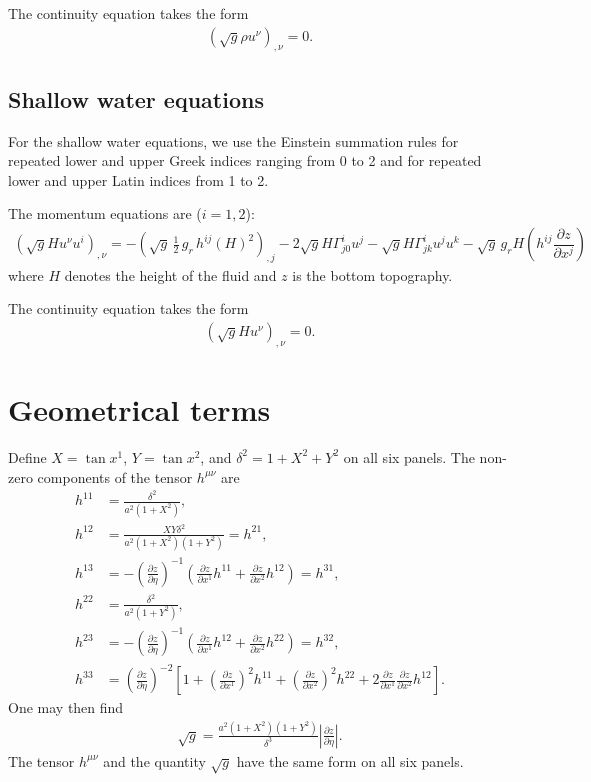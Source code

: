 \documentclass{article}
\begin{document}
The continuity equation takes the form
\begin{align}
\left( \sqrt{g}\rho u^\nu \right)_{,\nu} = 0.
\end{align}

\subsection{Shallow water equations}
For the shallow water equations, we use the Einstein summation rules for repeated lower and upper Greek indices ranging from 0 to 2 and for repeated lower and upper Latin indices from 1 to 2.

The momentum equations are ($i=1,2$):
\begin{align}
   \left( \sqrt{g} H u^\nu u^i\right)_{,\nu} = - \left( \sqrt{g} \, \frac{1}{2} \, g_r \, h^{ij} (H)^2 \right)_{,j} -2\sqrt{g} H \Gamma^i_{j0} u^j - \sqrt{g} H \Gamma^i_{jk}u^ju^k - \sqrt{g} \, g_r H \left( h^{ij} \dfrac{\partial z}{\partial x^j} \right)
\end{align}
where $H$ denotes the height of the fluid and $z$ is the bottom topography.

The continuity equation takes the form
\begin{align}
\left( \sqrt{g} H u^\nu \right)_{,\nu} = 0.
\end{align}


\section{Geometrical terms}
Define $X=\tan x^1$, $Y=\tan x^2$, and $\delta^2=1+X^2+Y^2$ on all six panels. The non-zero components of the tensor $h^{\mu \nu}$ are
\begin{align}
h^{11}&=\frac{\delta^2}{a^2(1+X^2)}, \\
h^{12}&=\frac{XY\delta^2}{a^2(1+X^2)(1+Y^2)}=h^{21}, \\
h^{13}&=-\left( \frac{\partial z}{\partial \eta} \right)^{-1} \left( \frac{\partial z}{\partial x^1} h^{11} + \frac{\partial z}{\partial x^2} h^{12} \right)=h^{31}, \\
h^{22}&=\frac{\delta^2}{a^2(1+Y^2)}, \\
h^{23}&=-\left( \frac{\partial z}{\partial \eta} \right)^{-1} \left( \frac{\partial z}{\partial x^1} h^{12} + \frac{\partial z}{\partial x^2} h^{22} \right)=h^{32}, \\
h^{33}&=\left( \frac{\partial z}{\partial \eta} \right)^{-2} \left[ 1 + \left( \frac{\partial z}{\partial x^1} \right)^2 h^{11} + \left( \frac{\partial z}{\partial x^2} \right)^2 h^{22} +2\frac{\partial z}{\partial x^1} \frac{\partial z}{\partial x^2} h^{12}\right].
\end{align}
One may then find
\begin{align}
\sqrt{g}=\frac{a^2 (1+X^2)(1+Y^2)}{\delta^3}\left|\frac{\partial z}{\partial\eta}\right|. \label{rgt}
\end{align}
The tensor $h^{\mu\nu}$ and the quantity $\sqrt{g}$ have the same form on all six panels.
\end{document}
